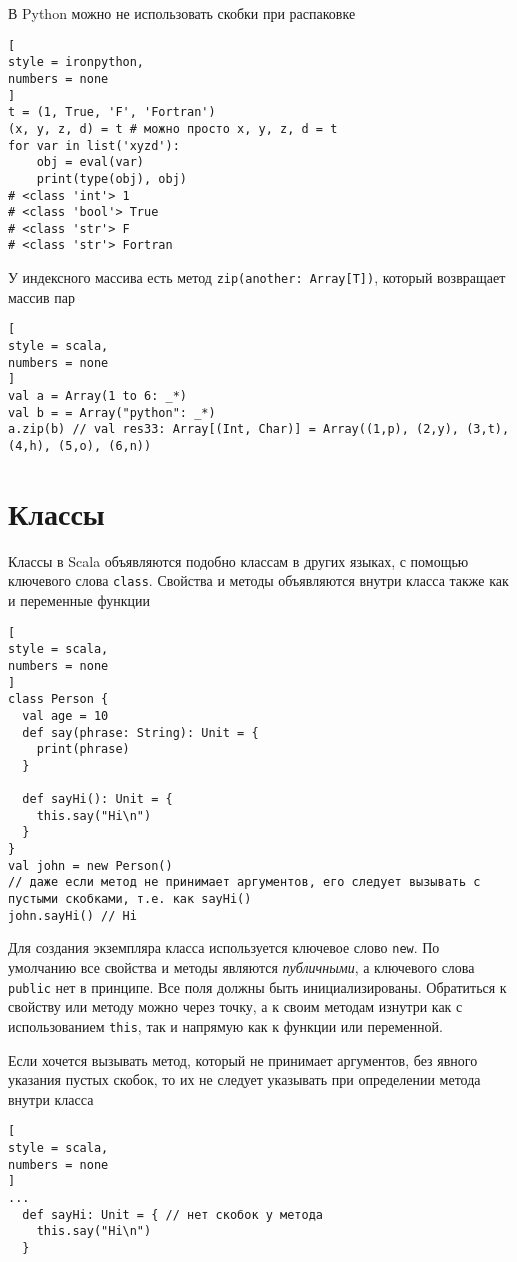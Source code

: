 \documentclass[%
	11pt,
	a4paper,
	utf8,
		]{article}
\begin{document}
В Python можно не использовать скобки при распаковке
\begin{lstlisting}[
style = ironpython,
numbers = none
]
t = (1, True, 'F', 'Fortran')
(x, y, z, d) = t # можно просто x, y, z, d = t
for var in list('xyzd'):
    obj = eval(var)
    print(type(obj), obj)
# <class 'int'> 1
# <class 'bool'> True
# <class 'str'> F
# <class 'str'> Fortran
\end{lstlisting}

У индексного массива есть метод \texttt{zip(another: Array[T])}, который возвращает массив пар
\begin{lstlisting}[
style = scala,
numbers = none
]
val a = Array(1 to 6: _*)
val b = = Array("python": _*)
a.zip(b) // val res33: Array[(Int, Char)] = Array((1,p), (2,y), (3,t), (4,h), (5,o), (6,n))
\end{lstlisting}

\section{Классы}

Классы в Scala объявляются подобно классам в других языках, с помощью ключевого слова \texttt{class}. Свойства и методы объявляются внутри класса также как и переменные функции
\begin{lstlisting}[
style = scala,
numbers = none
]
class Person {
  val age = 10
  def say(phrase: String): Unit = {
    print(phrase)
  }
  
  def sayHi(): Unit = {
    this.say("Hi\n")
  }
}
val john = new Person()
// даже если метод не принимает аргументов, его следует вызывать с пустыми скобками, т.е. как sayHi()
john.sayHi() // Hi
\end{lstlisting}

Для создания экземпляра класса используется ключевое слово \texttt{new}. По умолчанию все свойства и методы являются \emph{публичными}, а ключевого слова \texttt{public} нет в принципе. Все поля должны быть инициализированы. Обратиться к свойству или методу можно через точку, а к своим методам изнутри как с использованием \texttt{this}, так и напрямую как к функции или переменной.

Если хочется вызывать метод, который не принимает аргументов, без явного указания пустых скобок, то их не следует указывать при определении метода внутри класса
\begin{lstlisting}[
style = scala,
numbers = none
]
...
  def sayHi: Unit = { // нет скобок у метода
    this.say("Hi\n")
  }
\end{lstlisting}
\end{document}
